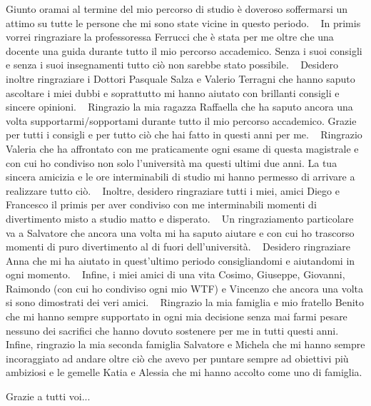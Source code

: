 \fancyhead[L]{}
\fancyhead[C]{}

Giunto oramai al termine del mio percorso di studio è doveroso soffermarsi un attimo su tutte le persone che mi sono state vicine in questo periodo.
\newline~\newline
In primis vorrei ringraziare la professoressa Ferrucci che è stata per me oltre che una docente una guida durante tutto il mio percorso accademico. Senza i suoi consigli e senza i suoi insegnamenti tutto ciò non sarebbe stato possibile.
\newline~\newline
Desidero inoltre ringraziare i Dottori Pasquale Salza e Valerio Terragni che hanno saputo ascoltare i miei dubbi e soprattutto mi hanno aiutato con brillanti consigli e sincere opinioni.
\newline~\newline
Ringrazio la mia ragazza Raffaella che ha saputo ancora una volta
supportarmi/sopportami durante tutto il mio percorso accademico. Grazie per tutti i consigli e per tutto ciò che hai fatto in questi anni per me.
\newline~\newline
Ringrazio Valeria che ha affrontato con me praticamente ogni esame di questa magistrale e con cui ho condiviso non solo l’università ma questi ultimi due anni. La tua sincera amicizia e le ore interminabili di studio mi hanno permesso di arrivare a realizzare tutto ciò.
\newline~\newline
Inoltre, desidero ringraziare tutti i miei, amici Diego e Francesco il primis per aver condiviso con me interminabili momenti di divertimento misto a studio matto e disperato. 
\newline~\newline
Un ringraziamento particolare va a Salvatore che ancora una volta mi ha saputo aiutare e con cui ho trascorso momenti di puro divertimento al di fuori dell’università.
\newline~\newline
Desidero ringraziare Anna che mi ha aiutato in quest’ultimo periodo consigliandomi e aiutandomi in ogni momento.
\newline~\newline
Infine, i miei amici di una vita Cosimo, Giuseppe, Giovanni, Raimondo (con cui ho condiviso ogni mio WTF) e Vincenzo che ancora una volta si sono dimostrati dei
veri amici.
\newline~\newline
Ringrazio la mia famiglia e mio fratello Benito che mi hanno sempre
supportato in ogni mia decisione senza mai farmi pesare nessuno dei sacrifici che hanno dovuto sostenere per me in tutti questi anni.
\newline~\newline
Infine, ringrazio la mia seconda famiglia Salvatore e Michela che mi hanno sempre incoraggiato ad andare oltre ciò che avevo per puntare sempre ad obiettivi più ambiziosi e le gemelle Katia e Alessia che mi hanno accolto come uno di famiglia.

\begin{flushright}
Grazie a tutti voi...
\end{flushright}